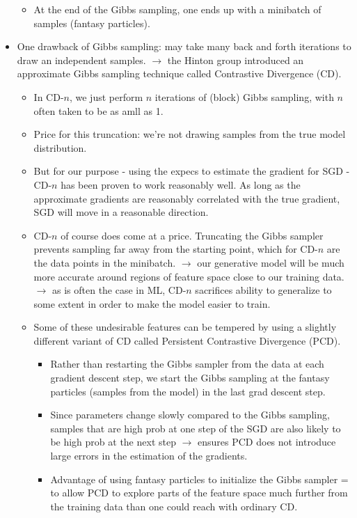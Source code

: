 \documentclass[norsk,a4paper,11pt]{article}
\begin{document}
\begin{itemize}
\begin{itemize}
		\item At the end of the Gibbs sampling, one ends up with a minibatch of samples (fantasy particles).
	\end{itemize}
	\item One drawback of Gibbs sampling: may take many back and forth iterations to draw an independent samples. $\rightarrow$ the Hinton group introduced an approximate Gibbs sampling technique called Contrastive Divergence (CD). 
	\begin{itemize}
		\item In CD-$n$, we just perform $n$ iterations of (block) Gibbs sampling, with $n$ often taken to be as amll as 1.
		\item Price for this truncation: we're not drawing samples from the true model distribution.
		\item But for our purpose - using the expecs to estimate the gradient for SGD - CD-$n$ has been proven to work reasonably well. As long as the approximate gradients are reasonably correlated with the true gradient, SGD will move in a reasonable direction. 
		\item CD-$n$ of course does come at a price. Truncating the Gibbs sampler prevents sampling far away from the starting point, which for CD-$n$ are the data points in the minibatch. $\rightarrow$ our generative model will be much more accurate around regions of feature space close to our training data. $\rightarrow$ as is often the case in ML, CD-$n$ sacrifices ability to generalize to some extent in order to make the model easier to train.
		\item Some of these undesirable features can be tempered by using a slightly different variant of CD called Persistent Contrastive Divergence (PCD). 
		\begin{itemize}
			\item Rather than restarting the Gibbs sampler from the data at each gradient descent step, we start the Gibbs sampling at the fantasy particles (samples from the model) in the last grad descent step.
			\item Since parameters change slowly compared to the Gibbs sampling, samples that are high prob at one step of the SGD are also likely to be high prob at the next step $\rightarrow$ ensures PCD does not introduce large errors in the estimation of the gradients. 
			\item Advantage of using fantasy particles to initialize the Gibbs sampler = to allow PCD to explore parts of the feature space much further from the training data than one could reach with ordinary CD. 
		\end{itemize}
	\end{itemize}
\end{itemize}
\end{document}
